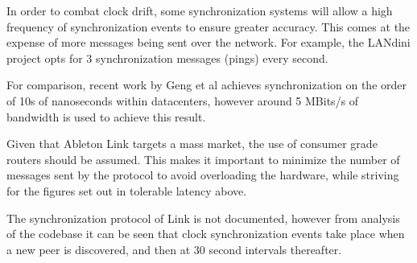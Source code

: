 \documentclass[11pt]{article} %
\theoremstyle{plain}
\theoremstyle{definition}
\begin{document}
In order to combat clock drift, some synchronization systems will allow a high
frequency of synchronization events to ensure greater accuracy. This comes at
the expense of more messages being sent over the network. For example, the
LANdini project opts for 3 synchronization messages (pings) every second.

For comparison, recent work by Geng et al\cite{geng2018} achieves
synchronization on the order of 10s of nanoseconds within datacenters, however
around 5 MBits/s of bandwidth is used to achieve this result.

Given that Ableton Link targets a mass market, the use of consumer grade
routers should be assumed. This makes it important to minimize the number of
messages sent by the protocol to avoid overloading the hardware, while striving
for the figures set out in tolerable latency above.

The synchronization protocol of Link is not documented, however from analysis
of the codebase it can be seen that clock synchronization events take place
when a new peer is discovered, and then at 30 second intervals thereafter.


%
%
%
%


\end{document}
